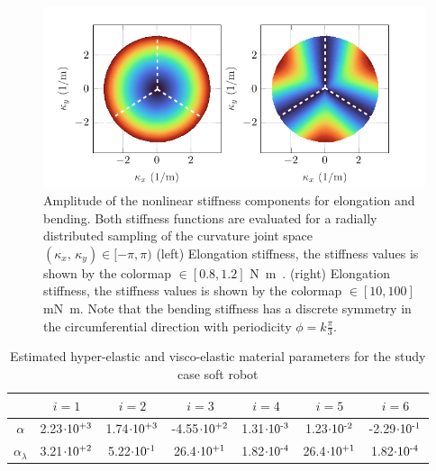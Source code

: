 {\pgfplotsset{colormap name=turbo}
\begin{figure}[!t]
  \vspace{-5mm}
  \centering
  \includegraphics*{./pdf/thesis-figure-4-9.pdf}
  \vspace{-0.25cm}
  \caption{ Amplitude of the nonlinear stiffness components for elongation and bending. Both stiffness functions are evaluated for a radially distributed sampling of the curvature joint space $(\kappa_x,\,\kappa_y) \in [-\pi,\pi)$ (left) Elongation stiffness, the stiffness values is shown by the colormap \protect{}$\!\!\in [0.8,1.2]$ \si{\newton \meter \inv}. (right) Elongation stiffness, the stiffness values is shown by the colormap \protect{}$\!\!\in [10,100]$ \si{\milli \newton  \meter}. Note that the bending stiffness has a discrete symmetry in the circumferential direction with periodicity $\phi = k\tfrac{\pi}{3}$.}
  \vspace{-0.1cm}
  \label{fig:C2:stiffness_model}
\end{figure}

\begin{table}[!t]
  \caption{Estimated hyper-elastic and visco-elastic material parameters for the study case soft robot \label{tab:C2:elastic_parameters}}
  \centering
  \begin{tabular}{ccccccc}
  \hline
  & $i=1$ &  $i=2$ &  $i=3$ & $i=4$ &  $i=5$ & $i=6$ \\
  \hline
  \hline
  $\alpha$ &  \small{2.23}$\cdot10^{\textrm{+3}}$  & \small{1.74}$\cdot10^{\textrm{+3}}$  &  \small{-4.55}$\cdot10^{\textrm{+2}}$ & \small{1.31}$\cdot10^{\textrm{-3}}$  & \small{1.23}$\cdot10^{\textrm{-2}}$ & \small{-2.29}$\cdot10^{\textrm{-1}}$ \\[0.15em]
   $\alpha_\lambda$ &  \small{3.21}$\cdot10^{\textrm{+2}}$ & \small{5.22}$\cdot10^{\textrm{-1}}$ &  \small{26.4}$\cdot10^{\textrm{+1}}$& \small{1.82}$\cdot10^{\textrm{-4}}$ & \small{26.4}$\cdot10^{\textrm{+1}}$ & \small{1.82}$\cdot10^{\textrm{-4}}$ \\
  \hline
  \end{tabular}
  \vspace{-3mm}
  \end{table}
  \clearpage
}

